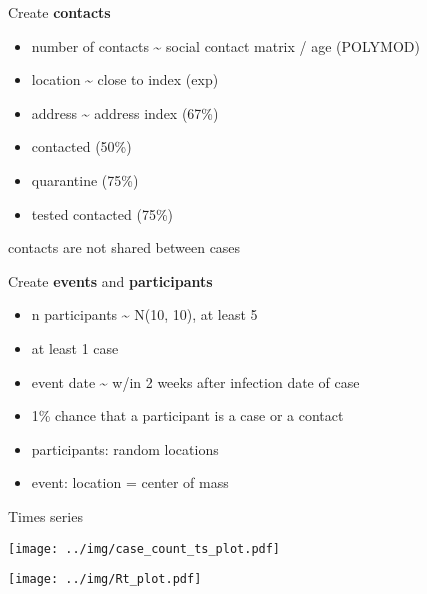 \documentclass[
  8pt,
  ignorenonframetext,
]{beamer}
\providecommand{\tightlist}{%
  \setlength{\itemsep}{0pt}\setlength{\parskip}{0pt}}
\begin{document}
\begin{frame}
Create \textbf{contacts}

\begin{itemize}
\tightlist
\item
  number of contacts \textasciitilde{} social contact matrix / age
  (POLYMOD)
\item
  location \textasciitilde{} close to index (exp)
\item
  address \textasciitilde{} address index (67\%)
\item
  contacted (50\%)
\item
  quarantine (75\%)
\item
  tested \textbar{} contacted (75\%)
\end{itemize}

\vspace{0.5cm}

contacts are not shared between cases
\end{frame}

\begin{frame}
Create \textbf{events} and \textbf{participants}

\begin{itemize}
\tightlist
\item
  n participants \textasciitilde{} N(10, 10), at least 5
\item
  at least 1 case
\item
  event date \textasciitilde{} w/in 2 weeks after infection date of case
\item
  1\% chance that a participant is a case or a contact
\item
  participants: random locations
\item
  event: location = center of mass
\end{itemize}
\end{frame}

\begin{frame}{Times series}
\protect\hypertarget{times-series}{}
\begin{center}
\texttt{[image: ../img/case\_count\_ts\_plot.pdf]}
\end{center}
\end{frame}

\begin{frame}
\begin{center}
\texttt{[image: ../img/Rt\_plot.pdf]}
\end{center}
\end{frame}
\end{document}
